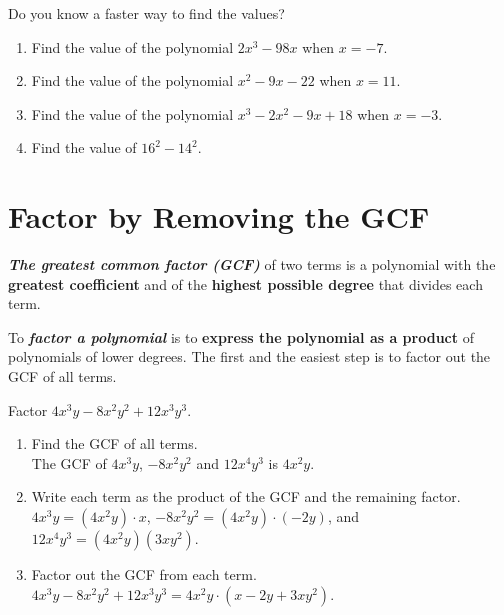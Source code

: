 \documentclass[
  en,11pt]{elegantbook}
\providecommand{\tightlist}{%
  \setlength{\itemsep}{0pt}\setlength{\parskip}{0pt}}
\newcommand{\size}[2]{{\fontsize{#1}{0}\selectfont#2}}
\renewenvironment{example}[1][]{
  \refstepcounter{exam}
  \par\noindent\textbf{\color{main}{\examplename} \theexam #1}
  \rmfamily
}{
  \par\ignorespacesafterend
}
\newenvironment{rmdthink}{
	\vspace*{0.5\baselineskip}
	\par\noindent
	\makebox[-4pt][r]{\color{green!90}\size{12}{\faLightbulbO}\,\,}
    \begin{tcolorbox}[
    enhanced,
    title={\textbf{\color{second}Think}},
    title style={left color=blue!10!green!20!white,right color=yellow!20!blue!20!white},
    colback=green!20!white,
    ]
    \sffamily
}{
    \end{tcolorbox}
	\par\ignorespacesafterend
}
\begin{document}
\begin{rmdthink}

Do you know a faster way to find the values?

\begin{enumerate}
\def\labelenumi{\arabic{enumi}.}
\tightlist
\item
  Find the value of the polynomial \(2x^3-98x\) when \(x=-7\).
\item
  Find the value of the polynomial \(x^2-9x-22\) when \(x=11\).
\item
  Find the value of the polynomial \(x^3-2x^2-9x+18\) when \(x=-3\).
\item
  Find the value of \(16^2-14^2\).
\end{enumerate}

\end{rmdthink}

\hypertarget{factor-by-removing-the-gcf}{%
\section{Factor by Removing the GCF}\label{factor-by-removing-the-gcf}}

\textbf{\emph{The greatest common factor (GCF)}} of two terms is a polynomial with the \textbf{greatest coefficient} and of the \textbf{highest possible degree} that divides each term.

To \textbf{\emph{factor a polynomial}} is to \textbf{express the polynomial as a product} of polynomials of lower degrees. The first and the easiest step is to factor out the GCF of all terms.

\begin{example}
Factor \(4x^3y-8x^2y^2+12x^3y^3\).
\end{example}

\begin{solution}

\begin{enumerate}
\def\labelenumi{\arabic{enumi}.}
\tightlist
\item
  Find the GCF of all terms.\\
  The GCF of \(4x^3y\), \(-8x^2y^2\) and \(12x^4y^3\) is \(4x^2y\).
\item
  Write each term as the product of the GCF and the remaining factor.\\
  \(4x^3y=(4x^2y)\cdot x\), \(-8x^2y^2=(4x^2y)\cdot (-2y)\), and \(12x^4y^3=(4x^2y)(3xy^2)\).
\item
  Factor out the GCF from each term.\\
  \(4x^3y-8x^2y^2+12x^3y^3=4x^2y\cdot(x-2y+3xy^2)\).
\end{enumerate}

\end{solution}
\end{document}
